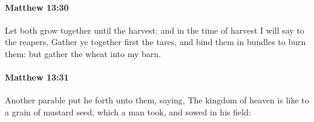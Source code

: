 		\paragraph{Matthew 13:30} %
			\label{MATTHEW-13-30}

			Let both grow together until the harvest: and in the time of harvest I will say to the reapers, Gather ye together first the tares, and bind them in bundles to burn them: but gather the wheat into my barn.

			\begin{framed}
			\scriptsize
				\begin{compactdesc}
					\item[SBLG] 
				\end{compactdesc}
			\end{framed}

		\paragraph{Matthew 13:31} %
			\label{MATTHEW-13-31}

			Another parable put he forth unto them, saying, The kingdom of heaven is like to a grain of mustard seed, which a man took, and sowed in his field:

